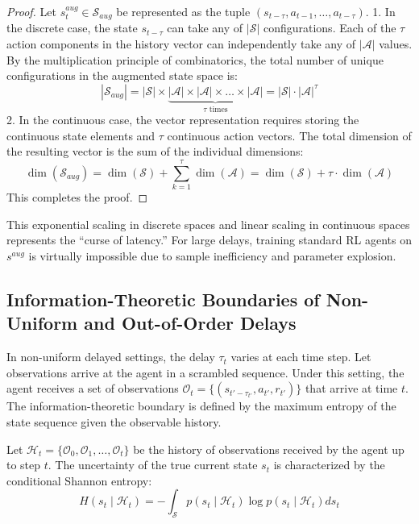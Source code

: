 \documentclass[manuscript, screen, review]{jair}
\begin{document}
\begin{proof}
Let $s^{aug}_t \in \mathcal{S}_{aug}$ be represented as the tuple $\left( s_{t - \tau}, a_{t - 1}, \dots, a_{t - \tau} \right)$. 
1. In the discrete case, the state $s_{t-\tau}$ can take any of $|\mathcal{S}|$ configurations. Each of the $\tau$ action components in the history vector can independently take any of $|\mathcal{A}|$ values. By the multiplication principle of combinatorics, the total number of unique configurations in the augmented state space is:
\begin{equation*}
    |\mathcal{S}_{aug}| = |\mathcal{S}| \times \underbrace{|\mathcal{A}| \times |\mathcal{A}| \times \dots \times |\mathcal{A}|}_{\tau \text{ times}} = |\mathcal{S}| \cdot |\mathcal{A}|^{\tau}
\end{equation*}
2. In the continuous case, the vector representation requires storing the continuous state elements and $\tau$ continuous action vectors. The total dimension of the resulting vector is the sum of the individual dimensions:
\begin{equation*}
    \dim(\mathcal{S}_{aug}) = \dim(\mathcal{S}) + \sum_{k=1}^{\tau} \dim(\mathcal{A}) = \dim(\mathcal{S}) + \tau \cdot \dim(\mathcal{A})
\end{equation*}
This completes the proof.
\end{proof}

This exponential scaling in discrete spaces and linear scaling in continuous spaces represents the ``curse of latency.'' For large delays, training standard RL agents on $s^{aug}$ is virtually impossible due to sample inefficiency and parameter explosion.

\subsection{Information-Theoretic Boundaries of Non-Uniform and Out-of-Order Delays}
In non-uniform delayed settings, the delay $\tau_t$ varies at each time step. Let observations arrive at the agent in a scrambled sequence. Under this setting, the agent receives a set of observations $\mathcal{O}_t = \{ (s_{t' - \tau_{t'}}, a_{t'}, r_{t'}) \}$ that arrive at time $t$. The information-theoretic boundary is defined by the maximum entropy of the state sequence given the observable history.

\begin{definition}
Let $\mathcal{H}_t = \{ \mathcal{O}_0, \mathcal{O}_1, \dots, \mathcal{O}_t \}$ be the history of observations received by the agent up to step $t$. The uncertainty of the true current state $s_t$ is characterized by the conditional Shannon entropy:
\begin{equation}
    H(s_t \mid \mathcal{H}_t) = - \int_{\mathcal{S}} p(s_t \mid \mathcal{H}_t) \log p(s_t \mid \mathcal{H}_t) ds_t
\end{equation}
\end{definition}
\end{document}
